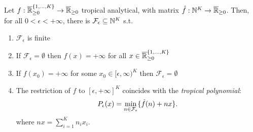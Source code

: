 \begin{theorem}
Let $f:\overline{\mathbb{R}}_{\geq 0}^{\{1,\dots, K\}} \to \overline{\mathbb{R}}_{\geq 0}$ tropical analytical, with matrix $\hat f : \mathbb{N}^{K} \to \overline{\mathbb{R}}_{\geq 0}$.
Then, for all $0<\epsilon<+\infty$, there is $\mathcal{F}_\epsilon\subseteq\mathbb{N}^{K}$ s.t.\
\begin{enumerate}
 \item $\mathcal{F}_\epsilon$ is finite
 \item If $\mathcal{F}_\epsilon= \emptyset$ then $f( x ) = +\infty$ for all $ x \in \overline{\mathbb{R}}_{\geq 0}^{\{1,\dots, K\}}$
 \item If $f( x _0) = +\infty$ for some $ x _0\in [\epsilon,\infty)^{K}$ then $\mathcal{F}_\epsilon= \emptyset$
 \item The restriction of $f$ to $[\epsilon,+\infty]^{K}$ coincides with the  \emph{tropical polynomial}:
      \[
        P_\epsilon( x )= \min\limits_{ n  \in\mathcal{F}_\epsilon} \{\hat f ( n  ) +  n   x \}.
      \]
      where $ n   x = \sum_{i=1}^{K}n_{i}x_{i}$.
\end{enumerate}
\end{theorem}
